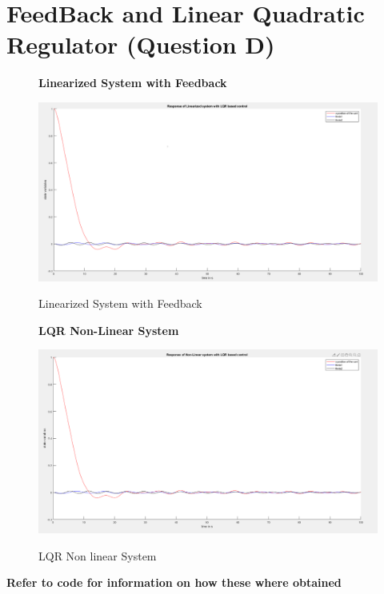 \documentclass[12pt]{article}
\begin{document}
\section{FeedBack and Linear Quadratic Regulator (Question D)}
\begin{figure}[H]
    \centering
    \textbf{ Linearized System with Feedback }\par\medskip
    \includegraphics[scale = 0.3]{lqrlinearized.png}\\[0.0 cm]	%
    \caption{Linearized System with Feedback} 
\end{figure}

\begin{figure}[H]
    \centering
    \textbf{ LQR Non-Linear System}\par\medskip
    \includegraphics[scale = 0.3]{lqrNonlinearized.png}\\[0.0 cm]	%
    \caption{LQR Non linear System} 
\end{figure}
\textbf{Refer to code for information on how these where obtained}
\end{document}
